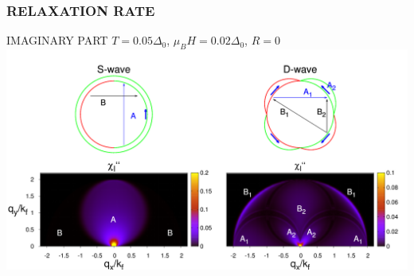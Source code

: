 \documentclass[amssymb,amsmath]{beamer}
\begin{document}
\begin{frame}
\frametitle{RELAXATION RATE}
{\huge IMAGINARY PART} $T=0.05\Delta_0$, $\mu_B H = 0.02\Delta_0$, $R=0$
\includegraphics[scale=0.12]{./figures_3/fig2_SD_andreev/Fig2_andreev_imag.png}

\end{frame}
\end{document}

